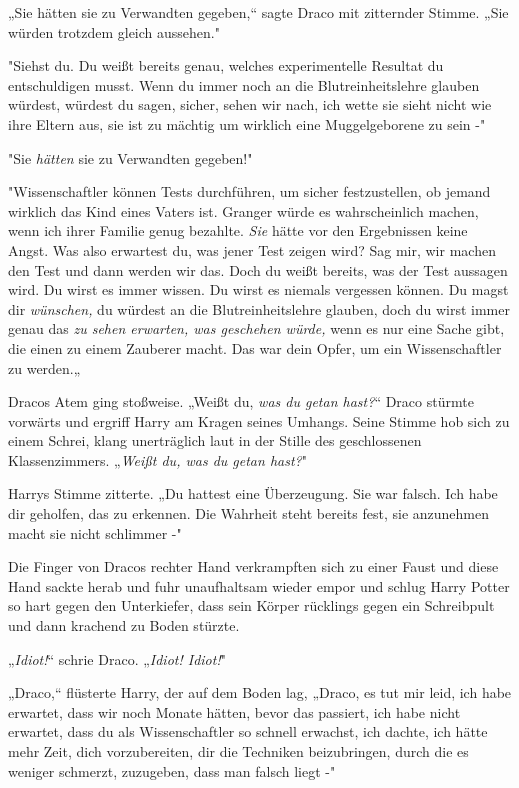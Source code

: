 {„Sie hätten sie zu Verwandten gegeben,“ sagte Draco mit zitternder Stimme. „Sie würden trotzdem gleich aussehen."

"Siehst du. Du weißt bereits genau, welches experimentelle Resultat du entschuldigen musst. Wenn du immer noch an die Blutreinheitslehre glauben würdest, würdest du sagen, sicher, sehen wir nach, ich wette sie sieht nicht wie ihre Eltern aus, sie ist zu mächtig um wirklich eine Muggelgeborene zu sein -"

"Sie \emph{hätten} sie zu Verwandten gegeben!"

"Wissenschaftler können Tests durchführen, um sicher festzustellen, ob jemand wirklich das Kind eines Vaters ist. Granger würde es wahrscheinlich machen, wenn ich ihrer Familie genug bezahlte. \emph{Sie} hätte vor den Ergebnissen keine Angst. Was also erwartest du, was jener Test zeigen wird? Sag mir, wir machen den Test und dann werden wir das. Doch du weißt bereits, was der Test aussagen wird. Du wirst es immer wissen. Du wirst es niemals vergessen können. Du magst dir \emph{wünschen,} du würdest an die Blutreinheitslehre glauben, doch du wirst immer genau das \emph{zu sehen erwarten, was geschehen würde,} wenn es nur eine Sache gibt, die einen zu einem Zauberer macht. Das war dein Opfer, um ein Wissenschaftler zu werden.„

Dracos Atem ging stoßweise. „Weißt du, \emph{was du getan hast?}“ Draco stürmte vorwärts und ergriff Harry am Kragen seines Umhangs. Seine Stimme hob sich zu einem Schrei, klang unerträglich laut in der Stille des geschlossenen Klassenzimmers. „\emph{Weißt du, was du getan hast?}"

Harrys Stimme zitterte. „Du hattest eine Überzeugung. Sie war falsch. Ich habe dir geholfen, das zu erkennen. Die Wahrheit steht bereits fest, sie anzunehmen macht sie nicht schlimmer -"

Die Finger von Dracos rechter Hand verkrampften sich zu einer Faust und diese Hand sackte herab und fuhr unaufhaltsam wieder empor und schlug Harry Potter so hart gegen den Unterkiefer, dass sein Körper rücklings gegen ein Schreibpult und dann krachend zu Boden stürzte.

„\emph{Idiot!}“ schrie Draco. „\emph{Idiot! Idiot!}"

„Draco,“ flüsterte Harry, der auf dem Boden lag, „Draco, es tut mir leid, ich habe erwartet, dass wir noch Monate hätten, bevor das passiert, ich habe nicht erwartet, dass du als Wissenschaftler so schnell erwachst, ich dachte, ich hätte mehr Zeit, dich vorzubereiten, dir die Techniken beizubringen, durch die es weniger schmerzt, zuzugeben, dass man falsch liegt -"

}

